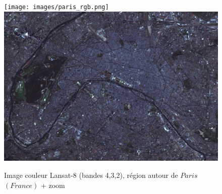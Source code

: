 \documentclass{book}
\begin{document}
\begin{figure}[H]
\begin{center}
\texttt{[image: images/paris\_rgb.png]}
\includegraphics[scale=0.5]{images/paris_rgb_zoom.png}
\end{center}
\caption{Image couleur Lansat-8 (bandes 4,3,2), région autour de $Paris$ $(France)$ + zoom}
\label{color_paris}
\end{figure}
\end{document}
